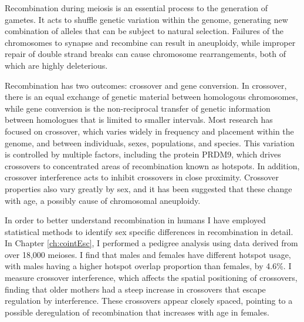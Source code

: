 \documentclass[11pt,twoside,openright,letterpaper]{memoir}
\begin{document}
Recombination during meiosis is an essential process to the generation of gametes.
It acts to shuffle genetic variation within the genome, generating new combination of alleles that can be subject to natural selection.
Failures of the chromosomes to synapse and recombine can result in aneuploidy, while improper repair of double strand breaks can cause chromosome rearrangements, both of which are highly deleterious.

Recombination has two outcomes: crossover and gene conversion.
In crossover, there is an equal exchange of genetic material between homologous chromosomes, while gene conversion is the non-reciprocal transfer of genetic information between homologues that is limited to smaller intervals.
Most research has focused on crossover, which varies widely in frequency and placement within the genome, and between individuals, sexes, populations, and species.
This variation is controlled by multiple factors, including the protein PRDM9, which drives crossovers to concentrated areas of recombination known as hotspots.
In addition, crossover interference acts to inhibit crossovers in close proximity.
Crossover properties also vary greatly by sex, and it has been suggested that these change with age, a possibly cause of chromosomal aneuploidy.

In order to better understand recombination in humans I have employed statistical methods to identify sex specific differences in recombination in detail.
In Chapter \ref{ch:cointEsc}, I performed a pedigree analysis using data derived from over 18,000 meioses.
I find that males and females have different hotspot usage, with males having a higher hotspot overlap proportion than females, by 4.6\%.
I measure crossover interference, which affects the spatial positioning of crossovers, finding that older mothers had a steep increase in crossovers that escape regulation by interference.
These crossovers appear closely spaced, pointing to a possible deregulation of recombination that increases with age in females.
\end{document}
